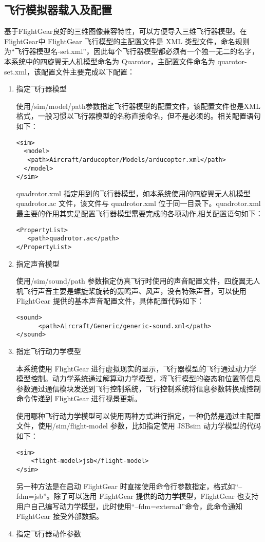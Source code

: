 \subsection{飞行模拟器载入及配置}
基于FlightGear良好的三维图像兼容特性，可以方便导入三维飞行器模型。在FlightGear中
FlightGear 飞行模型的主配置文件是 XML 类型文件，命名规则为“飞行器模型名-set.xml”，因此每个飞行器模型都必须有一个独一无二的名字，本系统中的四旋翼无人机模型命名为 Quarotor，主配置文件命名为 quarotor-set.xml，该配置文件主要完成以下配置：
\begin{enumerate}
\item
  指定飞行器模型

  使用/sim/model/path参数指定飞行器模型的配置文件，该配置文件也是XML格式，一般习惯以飞行器模型的名称直接命名，但不是必须的。相关配置语句如下：
 \begin{lstlisting}[language={[ANSI]C++}]
<sim>
  <model>
   <path>Aircraft/arducopter/Models/arducopter.xml</path>
  </model>
</sim>
\end{lstlisting}
quadrotor.xml 指定用到的飞行器模型，如本系统使用的四旋翼无人机模型quadrotor.ac 文件，该文件与 quadrotor.xml 位于同一目录下。quadrotor.xml 最主要的作用其实是配置飞行器模型需要完成的各项动作,相关配置语句如下：
\begin{lstlisting}[language={[ANSI]C++}]
<PropertyList>
   <path>quadrotor.ac</path>
</PropertyList>
\end{lstlisting}
\item 指定声音模型

使用/sim/sound/path 参数指定仿真飞行时使用的声音配置文件，四旋翼无人机飞行声音主要是螺旋桨旋转的轰鸣声、风声，没有特殊声音，可以使用FlightGear 提供的基本声音配置文件，具体配置代码如下：
\begin{lstlisting}[language={[ANSI]C++}]
<sound>
      <path>Aircraft/Generic/generic-sound.xml</path>
</sound>
\end{lstlisting}

\item 指定飞行动力学模型

本系统使用 FlightGear 进行虚拟现实的显示，飞行器模型的飞行通过动力学模型控制。动力学系统通过解算动力学模型，将飞行模型的姿态和位置等信息参数通过通信模块发送到飞行控制系统，飞行控制系统将信息参数转换成控制命令传递到 FlightGear 进行视景更新。

使用哪种飞行动力学模型可以使用两种方式进行指定，一种仍然是通过主配置文件，使用/sim/flight-model 参数，比如指定使用 JSBsim 动力学模型的代码如下：
\begin{lstlisting}[language={[ANSI]C++}]
<sim>
    <flight-model>jsb</flight-model>
</sim>
\end{lstlisting}
另一种方法是在启动 FlightGear 时直接使用命令行参数指定，格式如“--fdm=jsb”。除了可以选用 FlightGear 提供的动力学模型，FlightGear 也支持用户自己编写动力学模型，此时使用“--fdm=external”命令，此命令通知FlightGear 接受外部数据。
\item 指定飞行器动作参数


\end{enumerate}
